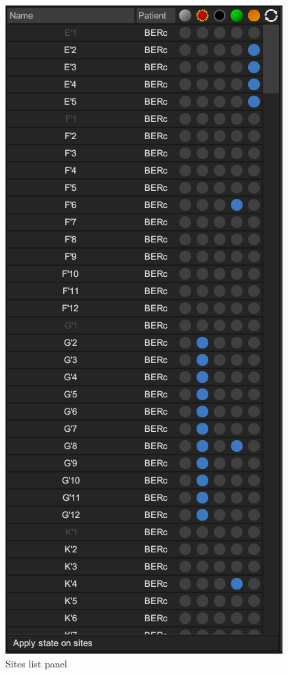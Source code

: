 \documentclass[a4paper]{article}
\begin{document}
\begin{figure}[H]
\begin{center}
\includegraphics[scale=0.5]{SitesList.png}
\end{center}
\caption{\label{sitesListPanel}Sites list panel}
\end{figure}
\end{document}
